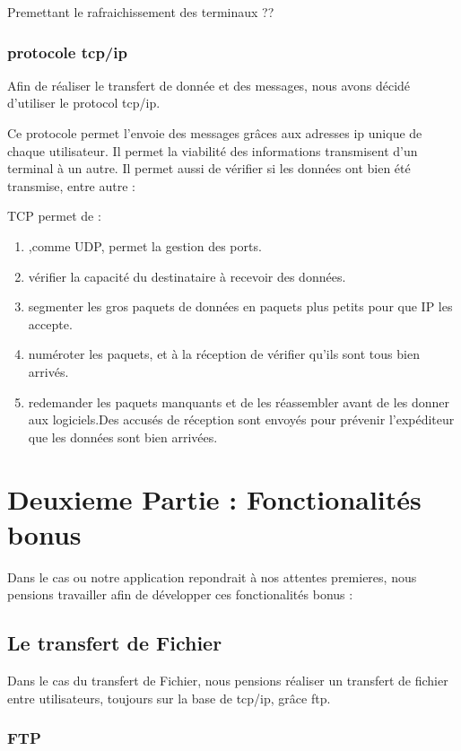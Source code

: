 \documentclass[a4paper 14pt]{article}
\begin{document}
Premettant le rafraichissement des terminaux ??

\newpage
\subsubsection{protocole tcp/ip}

Afin de réaliser le transfert de donnée et des messages, nous avons décidé d'utiliser le protocol tcp/ip.

Ce protocole permet l'envoie des messages grâces aux adresses ip unique de chaque utilisateur. Il permet la viabilité des informations transmisent d'un terminal à un autre. Il permet aussi de vérifier si les données ont bien été transmise, entre autre :

TCP permet de :
\begin{enumerate}
	\item ,comme UDP, permet la gestion des ports.
	\item vérifier la capacité du destinataire à recevoir des données.
	\item segmenter les gros paquets de données en paquets plus petits pour que IP les accepte.
	\item numéroter les paquets, et à la réception de vérifier qu'ils sont tous bien arrivés.
	\item redemander les paquets manquants et de les réassembler avant de les donner aux logiciels.Des accusés de réception sont envoyés pour prévenir l'expéditeur que les données sont bien arrivées.
\end{enumerate}


\newpage
\section{Deuxieme Partie : Fonctionalités bonus}

Dans le cas ou notre application repondrait à nos attentes premieres, nous pensions travailler afin de développer ces fonctionalités bonus :

\subsection{Le transfert de Fichier}

Dans le cas du transfert de Fichier, nous pensions réaliser un transfert de fichier entre utilisateurs, toujours sur la base de tcp/ip, grâce ftp.

\subsubsection{FTP}
\end{document}

